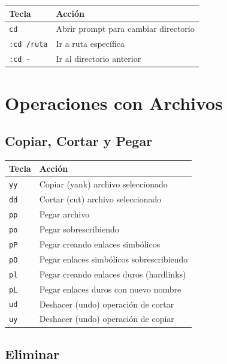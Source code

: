 \documentclass[
  doc,
  floatsintext,
  longtable,
  a4paper,
  nolmodern,
  notxfonts,
  notimes,
  12pt,
  colorlinks=true,linkcolor=blue,citecolor=blue,urlcolor=blue]{apa7}
\newcounter{none} %
\begin{document}
{\def\LTcaptype{none} %
\begin{longtable}[]{@{}ll@{}}
\toprule\noalign{}
Tecla & Acción \\
\midrule\noalign{}
\endhead
\bottomrule\noalign{}
\endlastfoot
\texttt{cd} & Abrir prompt para cambiar directorio \\
\texttt{:cd\ /ruta} & Ir a ruta específica \\
\texttt{:cd\ -} & Ir al directorio anterior \\
\end{longtable}
}

\section{Operaciones con Archivos}\label{operaciones-con-archivos}

\subsection{Copiar, Cortar y Pegar}\label{copiar-cortar-y-pegar}

{\def\LTcaptype{none} %
\begin{longtable}[]{@{}ll@{}}
\toprule\noalign{}
Tecla & Acción \\
\midrule\noalign{}
\endhead
\bottomrule\noalign{}
\endlastfoot
\texttt{yy} & Copiar (yank) archivo seleccionado \\
\texttt{dd} & Cortar (cut) archivo seleccionado \\
\texttt{pp} & Pegar archivo \\
\texttt{po} & Pegar sobrescribiendo \\
\texttt{pP} & Pegar creando enlaces simbólicos \\
\texttt{pO} & Pegar enlaces simbólicos sobrescribiendo \\
\texttt{pl} & Pegar creando enlaces duros (hardlinks) \\
\texttt{pL} & Pegar enlaces duros con nuevo nombre \\
\texttt{ud} & Deshacer (undo) operación de cortar \\
\texttt{uy} & Deshacer (undo) operación de copiar \\
\end{longtable}
}

\subsection{Eliminar}\label{eliminar}
\end{document}
